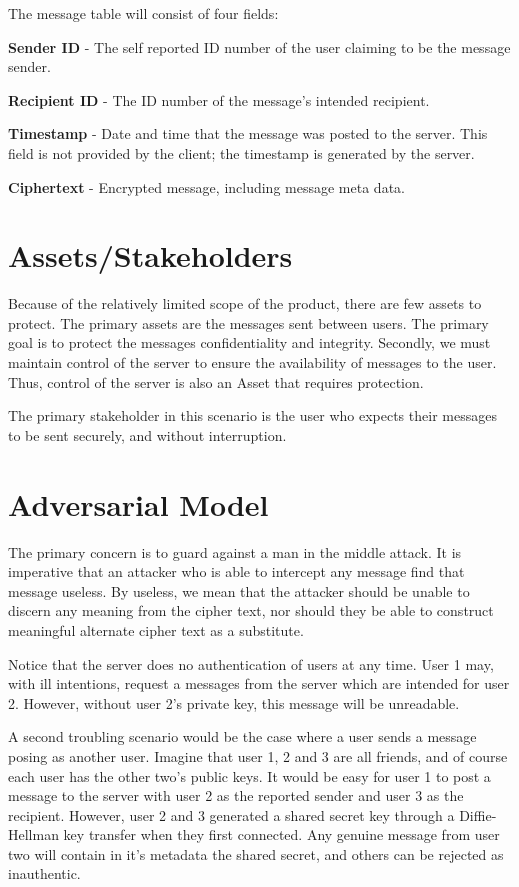 \documentclass[12pt]{article}
\begin{document}
The message table will consist of four fields:
\begin{outline}[enumerate]
	\1 \textbf{Sender ID} - The self reported ID number of the user claiming to
		be the message sender.

	\1 \textbf{Recipient ID} - The ID number of the message's intended recipient.

	\1 \textbf{Timestamp} - Date and time that the message was posted to the
		server.  This field is not provided by the client; the timestamp is
		generated by the server.

	\1 \textbf{Ciphertext} - Encrypted message, including message meta data.
\end{outline}

\section{Assets/Stakeholders}

Because of the relatively limited scope of the product, there are few assets to
protect.  The primary assets are the messages sent between users.  The primary
goal is to protect the messages confidentiality and integrity. Secondly, we
must maintain control of the server to ensure the availability of messages to
the user.  Thus, control of the server is also an Asset that requires
protection.

The primary stakeholder in this scenario is the user who expects
their messages to be sent securely, and without interruption.

\section{Adversarial Model}

The primary concern is to guard against a man in the middle attack.  It is
imperative that an attacker who is able to intercept any message find that
message useless.  By useless, we mean that the attacker should be unable to
discern any meaning from the cipher text, nor should they be able to construct
meaningful alternate cipher text as a substitute. 

Notice that the server does no authentication of users at any time.  User 1
may, with ill intentions, request a messages from the server which are intended
for user 2.  However, without user 2's private key, this message will be
unreadable.

A second troubling scenario would be the case where a user sends a message
posing as another user.  Imagine that user 1, 2 and 3 are all friends, and of
course each user has the other two's public keys.  It would be easy for user 1
to post a message to the server with user 2 as the reported sender and user 3
as the recipient.  However, user 2 and 3 generated a shared secret key through
a Diffie-Hellman key transfer when they first connected.  Any genuine message
from user two will contain in it's metadata the shared secret, and others can
be rejected as inauthentic. 
\end{document}
